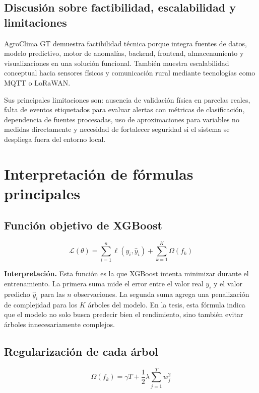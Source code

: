 \documentclass[12pt,letterpaper,oneside]{report}
\begin{document}
\section{Discusión sobre factibilidad, escalabilidad y limitaciones}
AgroClima GT demuestra factibilidad técnica porque integra fuentes de datos, modelo predictivo, motor de anomalías, backend, frontend, almacenamiento y visualizaciones en una solución funcional. También muestra escalabilidad conceptual hacia sensores físicos y comunicación rural mediante tecnologías como MQTT o LoRaWAN.

Sus principales limitaciones son: ausencia de validación física en parcelas reales, falta de eventos etiquetados para evaluar alertas con métricas de clasificación, dependencia de fuentes procesadas, uso de aproximaciones para variables no medidas directamente y necesidad de fortalecer seguridad si el sistema se despliega fuera del entorno local.

\chapter{Interpretación de fórmulas principales}

\section{Función objetivo de XGBoost}
\begin{equation}
\mathcal{L}(\theta)=\sum_{i=1}^{n}\ell(y_i,\hat{y}_i)+\sum_{k=1}^{K}\Omega(f_k)
\end{equation}

\textbf{Interpretación.} Esta función es la que XGBoost intenta minimizar durante el entrenamiento. La primera suma mide el error entre el valor real $y_i$ y el valor predicho $\hat{y}_i$ para las $n$ observaciones. La segunda suma agrega una penalización de complejidad para los $K$ árboles del modelo. En la tesis, esta fórmula indica que el modelo no solo busca predecir bien el rendimiento, sino también evitar árboles innecesariamente complejos.

\section{Regularización de cada árbol}
\begin{equation}
\Omega(f_k)=\gamma T+\frac{1}{2}\lambda\sum_{j=1}^{T}w_j^2
\end{equation}
\end{document}
